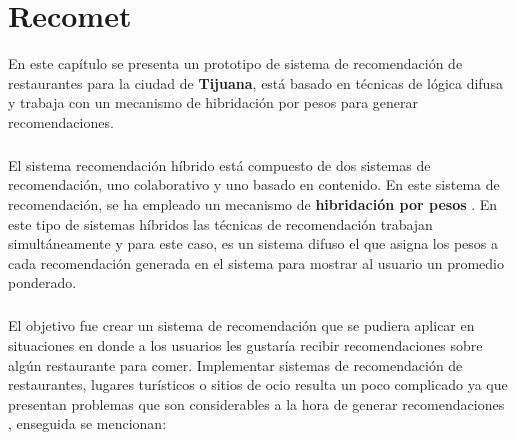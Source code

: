 \documentclass[12pt,letterpaper,oneside] {memoir}
\begin{document}
\chapter[Recomet: Recomendaciones de Tijuana]{Recomet}

En este capítulo se presenta un prototipo de sistema de recomendación de restaurantes para la ciudad de \textbf{Tijuana}, está basado en técnicas de lógica difusa y trabaja con un mecanismo de hibridación por pesos para generar recomendaciones.
 \paragraph*{}   
El sistema  recomendación híbrido está  compuesto de dos sistemas de  recomendación, uno colaborativo y uno basado en contenido.  En este sistema de recomendación, se ha empleado  un  mecanismo de \textbf{hibridación por pesos} \citep{Burke2002}. En este tipo de sistemas híbridos las técnicas de recomendación trabajan simultáneamente y para este caso, es un sistema difuso el que asigna los pesos a cada recomendación generada en el sistema para mostrar al usuario un promedio ponderado.
\paragraph{}
El  objetivo fue crear un sistema de recomendación que se pudiera aplicar en situaciones en donde a los usuarios les gustaría recibir recomendaciones sobre algún restaurante para comer. Implementar sistemas de recomendación de restaurantes, lugares turísticos o sitios de ocio resulta un poco complicado ya que presentan problemas que son considerables a la hora de generar recomendaciones \citep{PerezCordon2008}, enseguida se mencionan:
\end{document}
